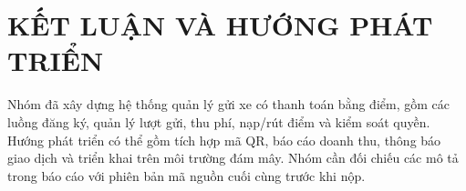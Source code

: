 \chapter*{KẾT LUẬN VÀ HƯỚNG PHÁT TRIỂN}
Nhóm đã xây dựng hệ thống quản lý gửi xe có thanh toán bằng điểm, gồm các luồng đăng ký, quản lý lượt gửi, thu phí, nạp/rút điểm và kiểm soát quyền. Hướng phát triển có thể gồm tích hợp mã QR, báo cáo doanh thu, thông báo giao dịch và triển khai trên môi trường đám mây. Nhóm cần đối chiếu các mô tả trong báo cáo với phiên bản mã nguồn cuối cùng trước khi nộp.
